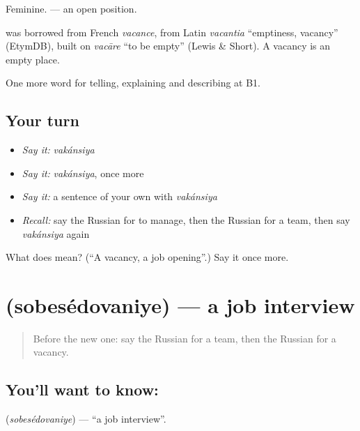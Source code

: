Feminine. \emph{ } — an open position.

\begin{cousinweb}
\textbf{} was borrowed from French \emph{vacance}, from Latin \emph{vacantia} \textquotedblleft{}emptiness, vacancy\textquotedblright{} (EtymDB), built on \emph{vacāre} \textquotedblleft{}to be empty\textquotedblright{} (Lewis \& Short). A vacancy is an empty place.
\end{cousinweb}

\begin{grammarlens}[title={What you've built}]
One more word for telling, explaining and describing at B1.
\end{grammarlens}

\subsection*{Your turn}
\begin{itemize}
\raggedright
  \item \emph{Say it:} \emph{vakánsiya}
  \item \emph{Say it:} \emph{vakánsiya}, once more
  \item \emph{Say it:} a sentence of your own with \emph{vakánsiya}
  \item \emph{Recall:} say the Russian for to manage, then the Russian for a team, then say \emph{vakánsiya} again
\end{itemize}

\begin{tcolorbox}[breakable,colback=teal!4,colframe=teal!35!black,title={Before you move on}]
What does  mean? (\textquotedblleft{}A vacancy, a job opening\textquotedblright{}.) Say it once more.
\end{tcolorbox}
\section[\texorpdfstring{\ru{собеседование} (sobesédovaniye)}{собеседование (sobesédovaniye)}]{ (sobesédovaniye) — a job interview}

\label{lesson:RU-C358-sobesedovanie}



\begin{quote}
Before the new one: say the Russian for a team, then the Russian for a vacancy.
\end{quote}

\subsection*{You'll want to know: }
\textbf{} (\emph{sobesédovaniye}) — \textquotedblleft{}a job interview\textquotedblright{}.

